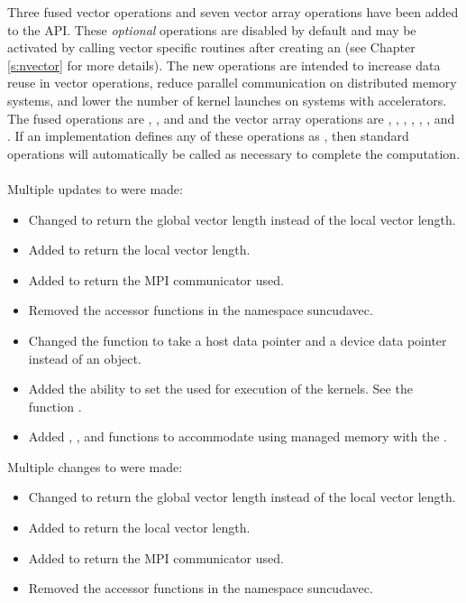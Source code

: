 Three fused vector operations and seven vector array operations have been added
to the {\nvector} API. These \textit{optional} operations are disabled by
default and may be activated by calling vector specific routines after creating
an {\nvector} (see Chapter \ref{s:nvector} for more details). The new operations
are intended to increase data reuse in vector operations, reduce parallel
communication on distributed memory systems, and lower the number of kernel
launches on systems with accelerators. The fused operations are
,
, and
and the vector array operations are
,
,
,
,
,
, and\\
.
If an {\nvector} implementation defines any of these operations as ,
then standard {\nvector} operations will automatically be called as necessary to
complete the computation.
\\
\\
\noindent Multiple updates to {\nveccuda} were made:
\begin{itemize}
  \item Changed  to return the global vector length
        instead of the local vector length.
  \item Added  to return the local vector length.
  \item Added  to return the MPI communicator used.
  \item Removed the accessor functions in the namespace suncudavec.
  \item Changed the  function to take a host data pointer and a device
        data pointer instead of an  object.
  \item Added the ability to set the  used for execution of the
        {\nveccuda} kernels. See the function .
  \item Added , , and
         functions to accommodate using managed
        memory with the {\nveccuda}.
\end{itemize}
%
Multiple changes to {\nvecraja} were made:
\begin{itemize}
  \item Changed  to return the global vector length
        instead of the local vector length.
  \item Added  to return the local vector length.
  \item Added  to return the MPI communicator used.
  \item Removed the accessor functions in the namespace suncudavec.
\end{itemize}
